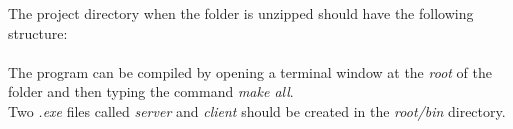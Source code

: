The project directory when the folder is unzipped should have the following structure:
\\
\ \\
The program can be compiled by opening a terminal window at the \emph{root} of the folder and then typing the command \emph{make all}.
\\
Two \emph{.exe} files called \textit{server} and \textit{client} should be created in the \emph{root/bin} directory. 